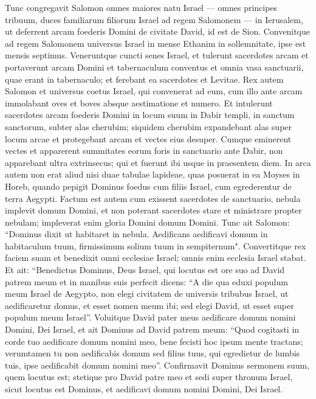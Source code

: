 \begin{biblechapter}  
\verse Tunc congregavit Salomon omnes maiores natu Israel — omnes principes tribuum, duces familiarum filiorum Israel ad regem Salomonem — in Ierusalem, ut deferrent arcam foederis Domini de civitate David, id est de Sion. 
\verse Convenitque ad regem Salomonem universus Israel in mense Ethanim in sollemnitate, ipse est mensis septimus. 
\verse Veneruntque cuncti senes Israel, et tulerunt sacerdotes arcam 
\verse et portaverunt arcam Domini et tabernaculum conventus et omnia vasa sanctuarii, quae erant in tabernaculo; et ferebant ea sacerdotes et Levitae. 
\verse Rex autem Salomon et universus coetus Israel, qui convenerat ad eum, cum illo ante arcam immolabant oves et boves absque aestimatione et numero. 
\verse Et intulerunt sacerdotes arcam foederis Domini in locum suum in Dabir templi, in sanctum sanctorum, subter alas cherubim; 
\verse siquidem cherubim expandebant alas super locum arcae et protegebant arcam et vectes eius desuper. 
\verse Cumque eminerent vectes et apparerent summitates eorum foris in sanctuario ante Dabir, non apparebant ultra extrinsecus; qui et fuerunt ibi usque in praesentem diem. 
\verse In arca autem non erat aliud nisi duae tabulae lapideae, quas posuerat in ea Moyses in Horeb, quando pepigit Dominus foedus cum filiis Israel, cum egrederentur de terra Aegypti. 
\verse Factum est autem cum exissent sacerdotes de sanctuario, nebula implevit domum Domini, 
\verse et non poterant sacerdotes stare et ministrare propter nebulam; impleverat enim gloria Domini domum Domini. 
\verse Tunc ait Salomon: “Dominus dixit ut habitaret in nebula. 
\verse Aedificans aedificavi domum in habitaculum tuum, firmissimum solium tuum in sempiternum". 
\verse Convertitque rex faciem suam et benedixit omni ecclesiae Israel; omnis enim ecclesia Israel stabat. 
\verse Et ait: “Benedictus Dominus, Deus Israel, qui locutus est ore suo ad David patrem meum et in manibus suis perfecit dicens:  
\verse “A die qua eduxi populum meum Israel de Aegypto, non elegi civitatem de universis tribubus Israel, ut aedificaretur domus, et esset nomen meum ibi; sed elegi David, ut esset super populum meum Israel”. 
\verse Voluitque David pater meus aedificare domum nomini Domini, Dei Israel, 
\verse et ait Dominus ad David patrem meum: “Quod cogitasti in corde tuo aedificare domum nomini meo, bene fecisti hoc ipsum mente tractans; 
\verse verumtamen tu non aedificabis domum sed filius tuus, qui egredietur de lumbis tuis, ipse aedificabit domum nomini meo”. 
\verse Confirmavit Dominus sermonem suum, quem locutus est; stetique pro David patre meo et sedi super thronum Israel, sicut locutus est Dominus, et aedificavi domum nomini Domini, Dei Israel. 

\end{biblechapter}
